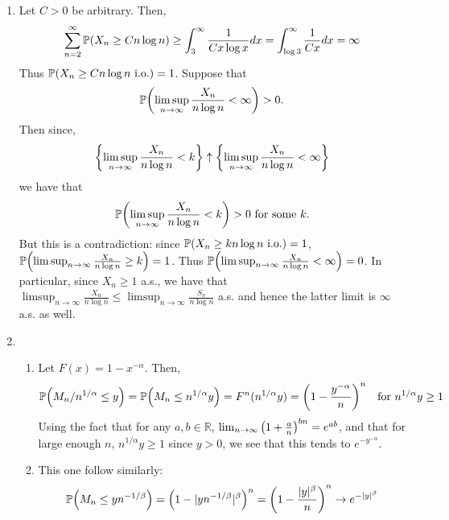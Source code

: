 \documentclass[12pt]{article}
\theoremstyle{definitionstyle}
\def\mbb#1{\mathbb{#1}}
\def\R{\mbb{R}}
\newcommand{\SET}[1]{\Set{\mskip-\medmuskip #1 \mskip-\medmuskip}}
\newcommand{\1}{\mathds 1}
\renewcommand{\P}{\mathbb P \qty}
\begin{document}
\begin{enumerate}
        \item Let $C > 0$ be arbitrary. Then,
        \begin{align*}
            \sum_{n=2}^\infty \P(X_n \geq C n\log n) \geq \int_{3}^\infty \frac{1}{C x \log x}dx = \int_{\log 3}^\infty \frac{1}{C x}dx = \infty
        \end{align*}
        Thus $\P(X_n \geq C n \log n \text{ i.o.}) = 1$. Suppose that 
        \begin{align*}
            \P(\limsup_{n \to \infty} \frac{X_n}{n \log n} < \infty) > 0.
        \end{align*}
        Then since,
        \begin{align*}
            \SET{\limsup_{n \to \infty} \frac{X_n}{n \log n} < k} \uparrow \SET{\limsup_{n \to \infty} \frac{X_n}{n \log n} < \infty}
        \end{align*} we have that 
        \begin{align*}
            \P(\limsup_{n \to \infty} \frac{X_n}{n \log n} < k) > 0 \text{ for some $k$.}
        \end{align*} 
        But this is a contradiction: since $\P(X_n \geq k n\log n \text{ i.o.}) = 1$, $\P(\limsup_{n \to \infty} \frac{X_n}{n \log n} \geq k) = 1$. Thus $\P(\limsup_{n \to \infty} \frac{X_n}{n \log n} < \infty) = 0$. In particular, since $X_n \geq 1$ a.s., we have that $\limsup_{n \to \infty} \frac{X_n}{n \log n} \leq \limsup_{n \to \infty} \frac{S_n}{n \log n}$ a.s. and hence the latter limit is $\infty$ a.s. as well.

        \item \begin{enumerate}
            \item Let $F(x) = 1-x^{-\alpha}$. Then,
            \begin{align*}
                \P(M_n/n^{1/\alpha} \leq y) = \P(M_n \leq n^{1/\alpha}y) = F^n(n^{1/\alpha}y) = \qty(1 - \frac{y^{-\alpha}}n)^n \quad \text{for $n^{1/\alpha} y \geq 1$}
            \end{align*}
            Using the fact that for any $a, b \in \R$, $\lim_{n \to \infty} \qty(1+\frac an)^{bn} = e^{ab}$, and that for large enough $n$, $n^{1/\alpha}y \geq 1$ since $y > 0$, we see that this tends to $e^{-y^{-\alpha}}$.

            \item This one follow similarly:
            \begin{align*}
                \P(M_n \leq yn^{-1/\beta}) = \qty(1-|yn^{-1/\beta}|^\beta)^n = \qty(1-\frac{|y|^{\beta}} n)^n \to e^{-|y|^\beta}
            \end{align*}


\end{enumerate}
\end{enumerate}
\end{document}
